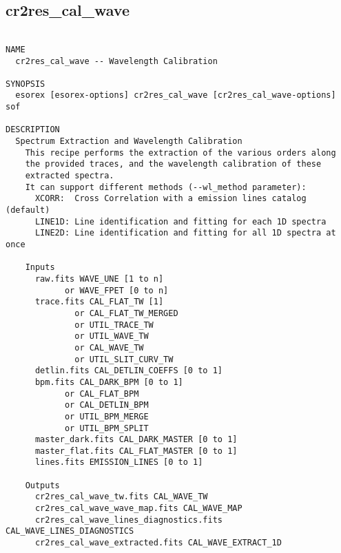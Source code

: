 \subsection{cr2res\_cal\_wave}
\begin{verbatim}

NAME
  cr2res_cal_wave -- Wavelength Calibration

SYNOPSIS
  esorex [esorex-options] cr2res_cal_wave [cr2res_cal_wave-options] sof

DESCRIPTION
  Spectrum Extraction and Wavelength Calibration                          
    This recipe performs the extraction of the various orders along       
    the provided traces, and the wavelength calibration of these          
    extracted spectra.                                                    
    It can support different methods (--wl_method parameter):             
      XCORR:  Cross Correlation with a emission lines catalog (default)   
      LINE1D: Line identification and fitting for each 1D spectra         
      LINE2D: Line identification and fitting for all 1D spectra at once  
                                                                          
    Inputs                                                                
      raw.fits WAVE_UNE [1 to n]                           
            or WAVE_FPET [0 to n]                          
      trace.fits CAL_FLAT_TW [1]                       
              or CAL_FLAT_TW_MERGED                    
              or UTIL_TRACE_TW                         
              or UTIL_WAVE_TW                          
              or CAL_WAVE_TW                           
              or UTIL_SLIT_CURV_TW                     
      detlin.fits CAL_DETLIN_COEFFS [0 to 1]           
      bpm.fits CAL_DARK_BPM [0 to 1]                   
            or CAL_FLAT_BPM                            
            or CAL_DETLIN_BPM                          
            or UTIL_BPM_MERGE                          
            or UTIL_BPM_SPLIT                          
      master_dark.fits CAL_DARK_MASTER [0 to 1]        
      master_flat.fits CAL_FLAT_MASTER [0 to 1]        
      lines.fits EMISSION_LINES [0 to 1]               
                                                                          
    Outputs                                                               
      cr2res_cal_wave_tw.fits CAL_WAVE_TW               
      cr2res_cal_wave_wave_map.fits CAL_WAVE_MAP        
      cr2res_cal_wave_lines_diagnostics.fits CAL_WAVE_LINES_DIAGNOSTICS
      cr2res_cal_wave_extracted.fits CAL_WAVE_EXTRACT_1D
                                                                          

\end{verbatim}
